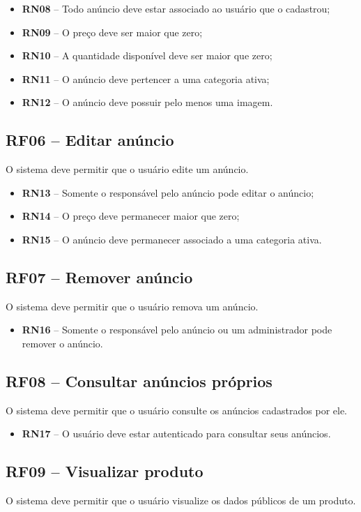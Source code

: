 \documentclass{scrreprt}
\begin{document}
\begin{itemize}
	\item \textbf{RN08} -- Todo anúncio deve estar associado ao usuário que o cadastrou;
	\item \textbf{RN09} -- O preço deve ser maior que zero;
	\item \textbf{RN10} -- A quantidade disponível deve ser maior que zero;
	\item \textbf{RN11} -- O anúncio deve pertencer a uma categoria ativa;
	\item \textbf{RN12} -- O anúncio deve possuir pelo menos uma imagem.
\end{itemize}

\subsection{RF06 -- Editar anúncio}
O sistema deve permitir que o usuário edite um anúncio.
\begin{itemize}
	\item \textbf{RN13} -- Somente o responsável pelo anúncio pode editar o anúncio;
	\item \textbf{RN14} -- O preço deve permanecer maior que zero;
	\item \textbf{RN15} -- O anúncio deve permanecer associado a uma categoria ativa.
\end{itemize}

\subsection{RF07 -- Remover anúncio}
O sistema deve permitir que o usuário remova um anúncio.
\begin{itemize}
	\item \textbf{RN16} -- Somente o responsável pelo anúncio ou um administrador pode remover o anúncio.
\end{itemize}

\subsection{RF08 -- Consultar anúncios próprios}
O sistema deve permitir que o usuário consulte os anúncios cadastrados por ele.
\begin{itemize}
	\item \textbf{RN17} -- O usuário deve estar autenticado para consultar seus anúncios.
\end{itemize}

\subsection{RF09 -- Visualizar produto}
O sistema deve permitir que o usuário visualize os dados públicos de um produto.
\end{document}
